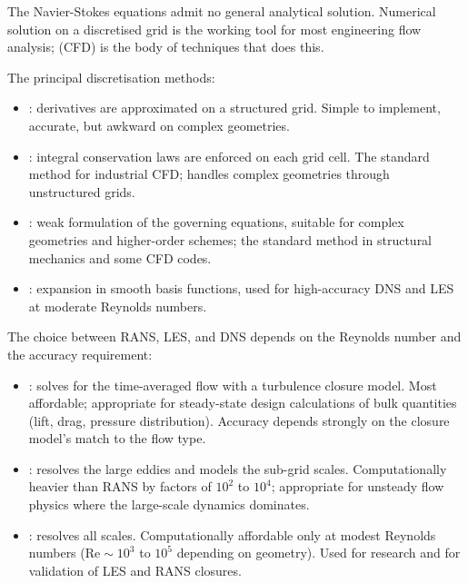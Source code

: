 The Navier-Stokes equations admit no general analytical solution.
Numerical solution on a discretised grid is the working tool for
most engineering flow analysis;  (CFD) is the body of techniques that does this.

The principal discretisation methods:

\begin{itemize}[leftmargin=*]
  \item {}: derivatives are approximated
    on a structured grid. Simple to implement, accurate, but
    awkward on complex geometries.
  \item {}: integral conservation laws are
    enforced on each grid cell. The standard method for industrial
    CFD; handles complex geometries through unstructured grids.
  \item {}: weak formulation of the
    governing equations, suitable for complex geometries and
    higher-order schemes; the standard method in structural
    mechanics and some CFD codes.
  \item {}: expansion in
    smooth basis functions, used for high-accuracy DNS and LES at
    moderate Reynolds numbers.
\end{itemize}

The choice between RANS, LES, and DNS depends on the Reynolds
number and the accuracy requirement:

\begin{itemize}[leftmargin=*]
  \item {}: solves for the time-averaged flow with a
    turbulence closure model. Most affordable; appropriate for
    steady-state design calculations of bulk quantities (lift,
    drag, pressure distribution). Accuracy depends strongly on the
    closure model's match to the flow type.
  \item {}: resolves the large eddies and models the
    sub-grid scales. Computationally heavier than RANS by factors
    of $10^2$ to $10^4$; appropriate for unsteady flow physics
    where the large-scale dynamics dominates.
  \item {}: resolves all scales. Computationally
    affordable only at modest Reynolds numbers ($\text{Re} \sim
    10^3$ to $10^5$ depending on geometry). Used for research and
    for validation of LES and RANS closures.
\end{itemize}

